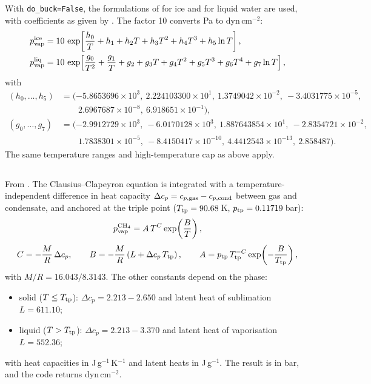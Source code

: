 \documentclass[11pt,a4paper]{article}
\newcommand{\code}[1]{\texttt{#1}}
\newcommand{\pvap}{p_{\rm vap}}
\newcommand{\chem}[1]{\mathrm{#1}}
\begin{document}
With \code{do\_buck=False}, the formulations of \citet{wexler1977} for ice
and \citet{wexler1976} for liquid water are used, with coefficients as
given by \citet{flatau1992}. The factor 10 converts Pa to dyn\,cm$^{-2}$:
\begin{align}
  \pvap^{\rm ice} &= 10\,\exp\!\left[\frac{h_0}{T} + h_1 + h_2 T + h_3 T^2
     + h_4 T^3 + h_5 \ln T\right], \\
  \pvap^{\rm liq} &= 10\,\exp\!\left[\frac{g_0}{T^2} + \frac{g_1}{T} + g_2
     + g_3 T + g_4 T^2 + g_5 T^3 + g_6 T^4 + g_7 \ln T\right],
\end{align}
with
\begin{align*}
  (h_0,\dots,h_5) &= (-5.8653696\times10^{3},\ 2.224103300\times10^{1},\
     1.3749042\times10^{-2},\ -3.4031775\times10^{-5},\\
     &\qquad 2.6967687\times10^{-8},\ 6.918651\times10^{-1}),\\
  (g_0,\dots,g_7) &= (-2.9912729\times10^{3},\ -6.0170128\times10^{3},\
     1.887643854\times10^{1},\ -2.8354721\times10^{-2},\\
     &\qquad 1.7838301\times10^{-5},\ -8.4150417\times10^{-10},\
     4.4412543\times10^{-13},\ 2.858487).
\end{align*}
The same temperature ranges and high-temperature cap as above apply.

\subsection{\texorpdfstring{\chem{CH_4}}{CH4}}
From \citet{lodders1998}. The Clausius--Clapeyron equation is integrated
with a temperature-independent difference in heat capacity
$\Delta c_p = c_{p,\rm gas} - c_{p,\rm cond}$ between gas and condensate,
and anchored at the triple point
($T_{\rm tp} = 90.68$\,K, $p_{\rm tp} = 0.11719$\,bar):
\begin{equation}
  \pvap^{\rm CH_4} = A\,T^{C}\exp\!\left(\frac{B}{T}\right),
\end{equation}
\begin{equation}
  C = -\frac{M}{R}\,\Delta c_p, \qquad
  B = -\frac{M}{R}\left(L + \Delta c_p\,T_{\rm tp}\right), \qquad
  A = p_{\rm tp}\,T_{\rm tp}^{-C}\exp\!\left(-\frac{B}{T_{\rm tp}}\right),
\end{equation}
with $M/R = 16.043/8.3143$. The other constants depend on the phase:
\begin{itemize}
  \item solid ($T \le T_{\rm tp}$): $\Delta c_p = 2.213 - 2.650$ and latent
        heat of sublimation $L = 611.10$;
  \item liquid ($T > T_{\rm tp}$): $\Delta c_p = 2.213 - 3.370$ and latent
        heat of vaporisation $L = 552.36$;
\end{itemize}
with heat capacities in J\,g$^{-1}$\,K$^{-1}$ and latent heats in
J\,g$^{-1}$. The result is in bar, and the code returns dyn\,cm$^{-2}$.
\end{document}
